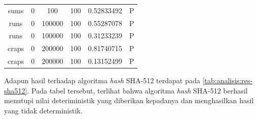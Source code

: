 \documentclass[conference]{IEEEtran}
\newcommand{\en}[1]
    {\foreignlanguage{english}{\textit{#1}}}
\begin{document}
\begin{table}[htbp]
\begin{center}
\begin{tabular}{|c|c|c|c|c|c|}
            sums           & 0            & 100          & 100          & 0.52833492            & P              \\
            runs           & 0            & 100000       & 100          & 0.55287078            & P              \\
            runs           & 0            & 100000       & 100          & 0.31233239            & P              \\
            craps          & 0            & 200000       & 100          & 0.81740715            & P              \\
            craps          & 0            & 200000       & 100          & 0.13152499            & P              \\
            \hline
        \end{tabular}
    \end{center}
\end{table}

Adapun hasil  terhadap algoritma \en{hash} SHA-512 terdapat pada \autoref{tab:analisis:res-sha512}.
Pada tabel tersebut, terlihat bahwa algoritma \en{hash} SHA-512 berhasil menutupi nilai deteriministik yang diberikan kepadanya dan menghasilkan hasil yang tidak deterministik.
\end{document}
